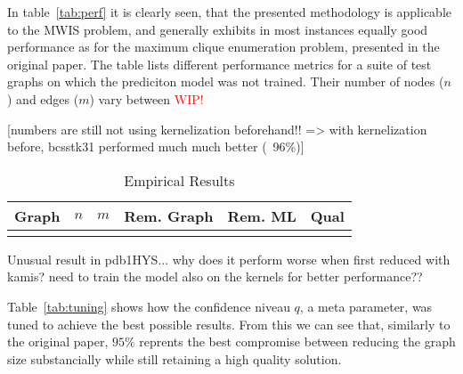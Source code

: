 \documentclass[acmsmall,nonacm,screen,review]{acmart}
\newcommand{\wip}{\textcolor{red}{WIP!}}
\begin{document}
In table~\ref{tab:perf} it is clearly seen, that the presented methodology is applicable to the MWIS problem,
and generally exhibits in most instances equally good performance as for the maximum clique enumeration problem,
presented in the original paper.
The table lists different performance metrics for a suite of test graphs on which the prediciton model was not trained.
Their number of nodes ($n$) and edges ($m$) vary between \wip


[numbers are still not using kernelization beforehand!! => with kernelization before, bcsstk31 performed much much better (~96\%)]
\begin{table}[ht]
\caption{Empirical Results}
\begin{tabular}{||l r r|r r r||}
  \hline
  Graph & $n$ & $m$& Rem. Graph & Rem. ML & Qual \\
  \hline
  \\
  \hline
\end{tabular}
\end{table}\label{tab:perf}

Unusual result in pdb1HYS... why does it perform worse when first reduced with kamis? need to train the model also on the kernels for better performance??

Table~\ref{tab:tuning} shows how the confidence niveau $q$, a meta parameter, was tuned
to achieve the best possible results.
From this we can see that, similarly to the original paper,
$95\%$ reprents the best compromise between reducing the graph size substancially
while still retaining a high quality solution.







\end{document}
